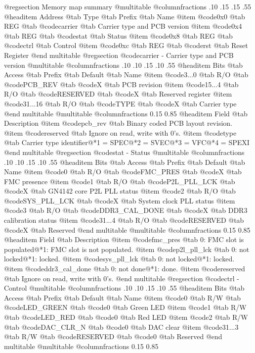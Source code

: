 @regsection Memory map summary
@multitable  @columnfractions .10 .15 .15 .55
@headitem Address @tab Type @tab Prefix @tab Name
@item @code{0x0} @tab
REG @tab
@code{carrier} @tab
Carrier type and PCB version
@item @code{0x4} @tab
REG @tab
@code{stat} @tab
Status
@item @code{0x8} @tab
REG @tab
@code{ctrl} @tab
Control
@item @code{0xc} @tab
REG @tab
@code{rst} @tab
Reset Register
@end multitable 
@regsection @code{carrier} - Carrier type and PCB version
@multitable @columnfractions .10 .10 .15 .10 .55
@headitem Bits @tab Access @tab Prefix @tab Default @tab Name
@item @code{3...0}
@tab R/O @tab
@code{PCB_REV}
@tab @code{X} @tab 
PCB revision
@item @code{15...4}
@tab R/O @tab
@code{RESERVED}
@tab @code{X} @tab 
Reserved register
@item @code{31...16}
@tab R/O @tab
@code{TYPE}
@tab @code{X} @tab 
Carrier type
@end multitable
@multitable @columnfractions 0.15 0.85
@headitem Field @tab Description
@item @code{pcb_rev} @tab Binary coded PCB layout revision.
@item @code{reserved} @tab Ignore on read, write with 0's.
@item @code{type} @tab Carrier type identifier@*1 = SPEC@*2 = SVEC@*3 = VFC@*4 = SPEXI
@end multitable
@regsection @code{stat} - Status
@multitable @columnfractions .10 .10 .15 .10 .55
@headitem Bits @tab Access @tab Prefix @tab Default @tab Name
@item @code{0}
@tab R/O @tab
@code{FMC_PRES}
@tab @code{X} @tab 
FMC presence
@item @code{1}
@tab R/O @tab
@code{P2L_PLL_LCK}
@tab @code{X} @tab 
GN4142 core P2L PLL status
@item @code{2}
@tab R/O @tab
@code{SYS_PLL_LCK}
@tab @code{X} @tab 
System clock PLL status
@item @code{3}
@tab R/O @tab
@code{DDR3_CAL_DONE}
@tab @code{X} @tab 
DDR3 calibration status
@item @code{31...4}
@tab R/O @tab
@code{RESERVED}
@tab @code{X} @tab 
Reserved
@end multitable
@multitable @columnfractions 0.15 0.85
@headitem Field @tab Description
@item @code{fmc_pres} @tab 0: FMC slot is populated@*1: FMC slot is not populated.
@item @code{p2l_pll_lck} @tab 0: not locked@*1: locked.
@item @code{sys_pll_lck} @tab 0: not locked@*1: locked.
@item @code{ddr3_cal_done} @tab 0: not done@*1: done.
@item @code{reserved} @tab Ignore on read, write with 0's.
@end multitable
@regsection @code{ctrl} - Control
@multitable @columnfractions .10 .10 .15 .10 .55
@headitem Bits @tab Access @tab Prefix @tab Default @tab Name
@item @code{0}
@tab R/W @tab
@code{LED_GREEN}
@tab @code{0} @tab 
Green LED
@item @code{1}
@tab R/W @tab
@code{LED_RED}
@tab @code{0} @tab 
Red LED
@item @code{2}
@tab R/W @tab
@code{DAC_CLR_N}
@tab @code{0} @tab 
DAC clear
@item @code{31...3}
@tab R/W @tab
@code{RESERVED}
@tab @code{0} @tab 
Reserved
@end multitable
@multitable @columnfractions 0.15 0.85
